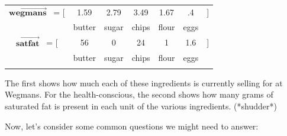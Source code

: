 \begin{center}
\begin{tabular}{ccccccc}
$\overrightarrow{\textbf{wegmans}}$ \quad \ = [ & 1.59 & 2.79 & 3.49 & 1.67 &
.4 &] \\
& \scriptsize{butter} & \scriptsize{sugar} & \scriptsize{chips} &
\scriptsize{flour} & \scriptsize{eggs} \medskip \\
$\overrightarrow{\textbf{satfat}}$ \quad \ = [ & 56 & 0 & 24 & 1 & 1.6 &] \\
& \scriptsize{butter} & \scriptsize{sugar} & \scriptsize{chips} &
\scriptsize{flour} & \scriptsize{eggs} \medskip \\
\normalsize
\end{tabular}
\end{center}
\vspace{-.15in}

The first shows how much each of these ingredients is currently selling for at
Wegmans. For the health-conscious, the second shows how many grams of
saturated fat is present in each unit of the various ingredients. (*shudder*)

\medskip
Now, let's consider some common questions we might need to answer:

